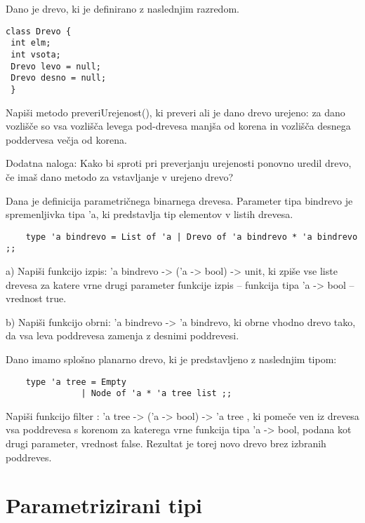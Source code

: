 \begin{ex}
Dano je drevo, ki je definirano z naslednjim razredom.

\begin{verbatim}
class Drevo {
 int elm;
 int vsota;
 Drevo levo = null;
 Drevo desno = null;
 }
\end{verbatim}

Napi\v si metodo preveriUrejenost(), ki preveri ali je dano drevo urejeno: za dano vozli\v s\v ce so vsa vozli\v s\v ca levega pod-drevesa manj\v sa od korena in vozli\v s\v ca desnega poddervesa ve\v cja od korena. 

Dodatna naloga: Kako bi sproti pri preverjanju urejenosti ponovno uredil drevo, \v ce ima\v s dano metodo za vstavljanje v urejeno drevo?
\end{ex}

\begin{ex}
Dana je definicija parametri\v cnega binarnega drevesa. Parameter tipa bindrevo je spremenljivka tipa 'a, ki predstavlja tip elementov v listih drevesa.

\begin{verbatim}
	type 'a bindrevo = List of 'a | Drevo of 'a bindrevo * 'a bindrevo ;;
\end{verbatim}

a) Napi\v si funkcijo izpis: 'a bindrevo -> ('a -> bool) -> unit, ki zpi\v se vse liste drevesa za katere vrne drugi parameter funkcije izpis -- funkcija tipa 'a -> bool -- vrednost true. 

b) Napi\v si funkcijo obrni: 'a bindrevo -> 'a bindrevo, ki obrne vhodno drevo tako, da vsa leva poddrevesa zamenja z desnimi poddrevesi. 

\end{ex}
\begin{ex} 
Dano imamo splo\v sno planarno drevo, ki je predstavljeno z naslednjim tipom:

\begin{verbatim}
	type 'a tree = Empty 
               | Node of 'a * 'a tree list ;; 
\end{verbatim}
Napi\v si funkcijo filter : 'a tree -> ('a -> bool) -> 'a tree , ki pome\v ce ven iz drevesa vsa poddrevesa s korenom za katerega vrne funkcija tipa 'a -> bool, podana kot drugi parameter, vrednost false. Rezultat je torej novo drevo brez izbranih poddreves. 
\end{ex}





\section{Parametrizirani tipi}


